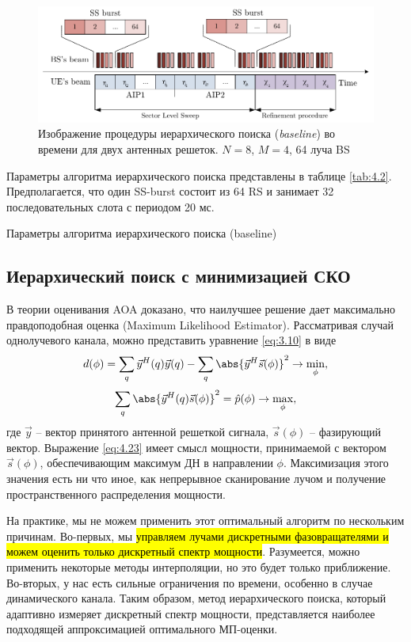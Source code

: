 \begin{figure}[ht]
    \centering
    \includegraphics[width=\linewidth]{figs/fig4.9}
    \caption{Изображение процедуры иерархического поиска (\textit{baseline}) во времени для двух антенных решеток. $N=8$, $M=4$, 64 луча BS}
    \label{fig:4.9}
\end{figure}

Параметры алгоритма иерархического поиска представлены в таблице \ref{tab:4.2}.
Предполагается, что один SS-burst состоит из 64 RS и занимает 32 последовательных слота с периодом 20 мс.

\begin{table}
    \caption{Параметры алгоритма иерархического поиска (baseline)}
    \label{tab:4.2}
\end{table}


\subsection{Иерархический поиск с минимизацией СКО}
В теории оценивания AOA доказано, что наилучшее решение дает максимально правдоподобная оценка (Maximum Likelihood Estimator).
Рассматривая случай однолучевого канала, можно представить уравнение \eqref{eq:3.10} в виде
\begin{equation}
    d(\phi) = \sum\limits_q \vec y^H(q) \vec y(q) - \sum\limits_q\abs{\vec y^H \vec s(\phi)}^2 \to \min_\phi,
\end{equation}
\begin{equation}
    \label{eq:4.23}
    \sum\limits_q \abs{\vec y^H(q) \vec s(\phi)}^2 = \hat p(\phi) \to \max_\phi,
\end{equation}
где $\vec y$ -- вектор принятого антенной решеткой сигнала, $\vec s(\phi)$ --
фазирующий вектор. Выражение \eqref{eq:4.23} имеет смысл мощности,
принимаемой с  вектором $\vec s(\phi)$, обеспечивающим максимум ДН в направлении
$\phi$. Максимизация этого значения есть ни что иное, как непрерывное
сканирование лучом и получение пространственного распределения мощности.

На практике, мы не можем применить этот оптимальный алгоритм по нескольким
причинам. Во-первых, мы \hl{управляем лучами дискретными фазовращателями и можем
    оценить только дискретный спектр мощности}. Разумеется, можно применить некоторые
методы интерполяции, но это будет только приближение.  Во-вторых, у нас есть
сильные ограничения по времени, особенно в случае динамического канала.  Таким
образом, метод иерархического поиска, который адаптивно измеряет дискретный
спектр мощности, представляется наиболее подходящей аппроксимацией оптимального
МП-оценки.

